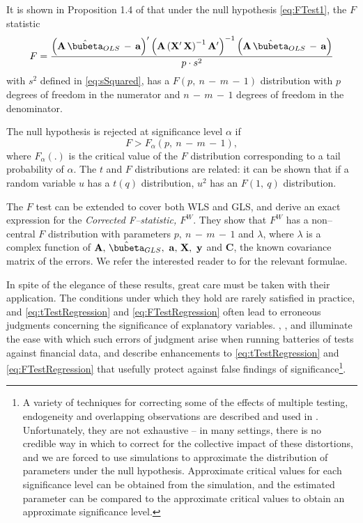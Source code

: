 \documentclass[graybox,envcountchap,sectrefs]{svmono}\usepackage[]{graphicx}\usepackage[]{xcolor}
\begin{document}
\begin{appendices}
It is shown in Proposition 1.4 of \citet{Hayashi2000} that under
the null hypothesis \eqref{eq:FTest1}, the $F$ statistic
\begin{equation}
F=\frac{\left(\mathrm{\mathbf{A}}\,\hat{\bubeta}_{OLS}\,-\,\mathrm{\mathbf{a}}\right)^{\prime}\left(\mathrm{\mathbf{A}}\left(\mathrm{\mathbf{X}}^{\prime}\,\mathrm{\mathbf{X}}\right)^{-1}\mathrm{\mathbf{A}}^{\prime}\right)^{-1}\left(\mathrm{\mathbf{A}}\,\hat{\bubeta}_{OLS}\,-\,\mathrm{\mathbf{a}}\right)}{p\cdot s^{2}}\label{eq:Fstatistic}
\end{equation}
with $s^{2}$ defined in \eqref{eq:sSquared}, has a $F\left(p,\ n\,-\,m\,-\,1\right)$
distribution with $p$ degrees of freedom in the numerator and $n\,-\,m\,-\,1$
degrees of freedom in the denominator.

The null hypothesis is rejected at significance level $\alpha$ if
\begin{equation}
F>F_{\alpha}\left(p,\ n\,-\,m\,-\,1\right),\label{eq:FTestRegression}
\end{equation}
where $F_{\alpha}\left(.\right)$ is the critical value of the $F$
distribution corresponding to a tail probability of $\alpha$. The
$t$ and $F$ distributions are related: it can be shown that if a
random variable $u$ has a $t(q)$ distribution, $u^{2}$ has an $F\left(1,\ q\right)$
distribution.

The $F$ test can be extended to cover both WLS and GLS, and \citet{ScarianoDavenport1984}
derive an exact expression for the \emph{Corrected F--statistic,
$F^{W}$}. They show that $F^{W}$ has a non--central $F$ distribution
with parameters $p,\ n\,-\,m\,-\,1$ and $\lambda$, where $\lambda$
is a complex function of $\mathrm{\mathbf{A},\ }\hat{\bubeta}_{GLS},\ \mathrm{\mathbf{a},}\ \mathbf{X,\ \mathrm{\mathbf{y}}}$
and $\mathrm{\mathbf{C}}$, the known covariance matrix of the errors.
We refer the interested reader to \citet{ScarianoDavenport1984} for
the relevant formulae.

In spite of the elegance of these results, great care must be taken
with their application. The conditions under which they hold are rarely
satisfied in practice, and \eqref{eq:tTestRegression} and \eqref{eq:FTestRegression}
often lead to erroneous judgments concerning the significance of explanatory
variables. \citet{Harvey2017}, \citet{Harvey2019}, and \citet{BRR2021}
illuminate the ease with which such errors of judgment arise when
running batteries of tests against financial data, and describe enhancements
to \eqref{eq:tTestRegression} and \eqref{eq:FTestRegression} that
usefully protect against false findings of significance\footnote{A variety of techniques for correcting some of the effects of multiple
testing, endogeneity and overlapping observations are described and
used in \ExpectedReturnChapter. Unfortunately, they are not exhaustive
-- in many settings, there is no credible way in which to correct
for the collective impact of these distortions, and we are forced
to use simulations to approximate the distribution of parameters under
the null hypothesis. Approximate critical values for each significance
level can be obtained from the simulation, and the estimated parameter
can be compared to the approximate critical values to obtain an approximate
significance level.}.


\end{appendices}
\end{document}
